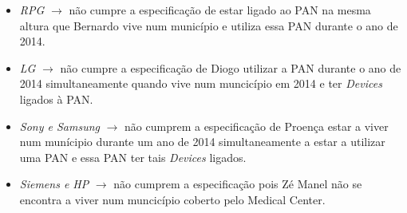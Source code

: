 \documentclass[a4paper]{article}
\begin{document}
	\begin{itemize}
	\item \textit{RPG} $\rightarrow$ não cumpre a especificação de estar ligado ao PAN na mesma
	altura que Bernardo vive num município e utiliza essa PAN durante o ano de 2014.
	
	\item \textit{LG} $\rightarrow$ não cumpre a especificação de Diogo utilizar a PAN durante
	o ano de 2014 simultaneamente quando vive num muncicípio em 2014 e ter
	\textit{Devices} ligados à PAN.
	
	\item \textit{Sony e Samsung} $\rightarrow$ não cumprem a especificação de Proença estar
	a viver num munícipio durante um ano de 2014 simultaneamente a estar
	a utilizar uma PAN e essa PAN ter tais \textit{Devices} ligados.
	
	\item \textit{Siemens e HP} $\rightarrow$ não cumprem a especificação pois Zé Manel não
	se encontra a viver num muncicípio coberto pelo Medical Center.
	\end{itemize}		
	
	
\end{document}
